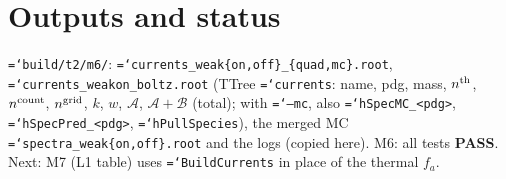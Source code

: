 \documentclass[11pt,a4paper]{article}
\newcommand{\pass}{\textcolor{green!45!black}{\textbf{PASS}}}
\newcommand{\code}[1]{\texttt{\hyphenchar\font=`\-#1}}
\begin{document}
\section{Outputs and status}
\code{build/t2/m6/}: \code{currents\_weak\{on,off\}\_\{quad,mc\}.root},
\code{currents\_weakon\_boltz.root} (TTree \code{currents}: name, pdg, mass, $n^{\rm th}$,
$n^{\rm count}$, $n^{\rm grid}$, $k$, $w$, $\mathcal A$, $\mathcal A+\mathcal B$ (total); with
\code{--mc}, also \code{hSpecMC\_<pdg>}, \code{hSpecPred\_<pdg>}, \code{hPullSpecies}), the merged MC
\code{spectra\_weak\{on,off\}.root} and the logs (copied here). M6: all tests \pass. Next: M7
(L1 table) uses \code{BuildCurrents} in place of the thermal $f_a$.
\end{document}
